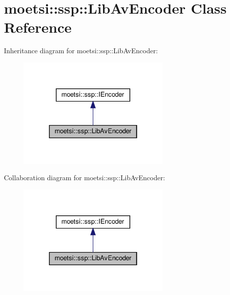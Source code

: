 \hypertarget{classmoetsi_1_1ssp_1_1LibAvEncoder}{}\section{moetsi\+:\+:ssp\+:\+:Lib\+Av\+Encoder Class Reference}
\label{classmoetsi_1_1ssp_1_1LibAvEncoder}


Inheritance diagram for moetsi\+:\+:ssp\+:\+:Lib\+Av\+Encoder\+:
\nopagebreak
\begin{figure}[H]
\begin{center}
\leavevmode
\includegraphics[width=214pt]{classmoetsi_1_1ssp_1_1LibAvEncoder__inherit__graph}
\end{center}
\end{figure}


Collaboration diagram for moetsi\+:\+:ssp\+:\+:Lib\+Av\+Encoder\+:
\nopagebreak
\begin{figure}[H]
\begin{center}
\leavevmode
\includegraphics[width=214pt]{classmoetsi_1_1ssp_1_1LibAvEncoder__coll__graph}
\end{center}
\end{figure}
